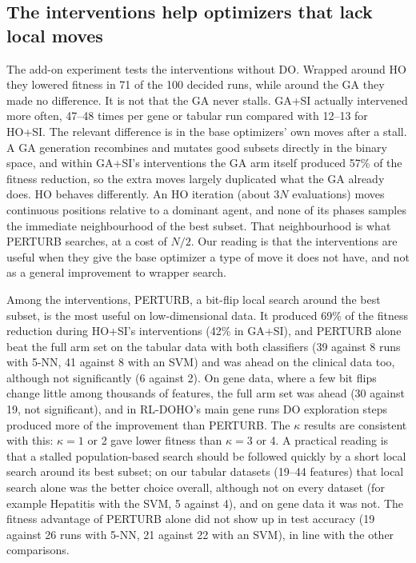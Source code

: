 \documentclass[pdflatex,sn-basic]{sn-jnl}
\begin{document}
\subsection{The interventions help optimizers that lack local moves}
The add-on experiment tests the interventions without DO. Wrapped around HO they lowered fitness in 71 of the 100 decided runs, while around the GA they made no difference. It is not that the GA never stalls. GA+SI actually intervened more often, 47--48 times per gene or tabular run compared with 12--13 for HO+SI. The relevant difference is in the base optimizers' own moves after a stall. A GA generation recombines and mutates good subsets directly in the binary space, and within GA+SI's interventions the GA arm itself produced 57\% of the fitness reduction, so the extra moves largely duplicated what the GA already does. HO behaves differently. An HO iteration (about $3N$ evaluations) moves continuous positions relative to a dominant agent, and none of its phases samples the immediate neighbourhood of the best subset. That neighbourhood is what PERTURB searches, at a cost of $N/2$. Our reading is that the interventions are useful when they give the base optimizer a type of move it does not have, and not as a general improvement to wrapper search.

Among the interventions, PERTURB, a bit-flip local search around the best subset, is the most useful on low-dimensional data. It produced 69\% of the fitness reduction during HO+SI's interventions (42\% in GA+SI), and PERTURB alone beat the full arm set on the tabular data with both classifiers (39 against 8 runs with 5-NN, 41 against 8 with an SVM) and was ahead on the clinical data too, although not significantly (6 against 2). On gene data, where a few bit flips change little among thousands of features, the full arm set was ahead (30 against 19, not significant), and in RL-DOHO's main gene runs DO exploration steps produced more of the improvement than PERTURB. The $\kappa$ results are consistent with this: $\kappa=1$ or 2 gave lower fitness than $\kappa=3$ or 4. A practical reading is that a stalled population-based search should be followed quickly by a short local search around its best subset; on our tabular datasets (19--44 features) that local search alone was the better choice overall, although not on every dataset (for example Hepatitis with the SVM, 5 against 4), and on gene data it was not. The fitness advantage of PERTURB alone did not show up in test accuracy (19 against 26 runs with 5-NN, 21 against 22 with an SVM), in line with the other comparisons.
\end{document}
